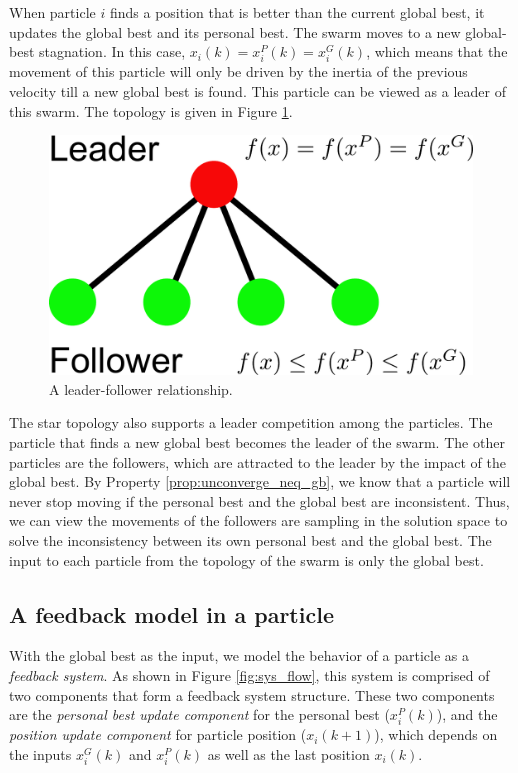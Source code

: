 When particle $ i $ finds a position that is better than the current global best, it updates the global best and its personal best.
The swarm moves to a new global-best stagnation.
In this case, $ x_{i}(k) = x_{i}^{P}(k) = x_{i}^{G}(k) $, which means that the movement of this particle will only be driven by the inertia of the previous velocity till a new global best is found.
This particle can be viewed as a leader of this swarm.
The topology is given in Figure \ref{fig:leader_follower}.
\begin{figure}[tbph]
\centering
\includegraphics[width=0.5\linewidth]{./fig/leader_follower}
\caption{A leader-follower relationship.}
\label{fig:leader_follower}
\end{figure}

The star topology also supports a leader competition among the particles.
The particle that finds a new global best becomes the leader of the swarm.
The other particles are the followers, which are attracted to the leader by the impact of the global best.
By Property \ref{prop:unconverge_neq_gb}, we know that a particle will never stop moving if the personal best and the global best are inconsistent.
Thus, we can view the movements of the followers are sampling in the solution space to solve the inconsistency between its own personal best and the global best.
The input to each particle from the topology of the swarm is only the global best.

\subsection{A feedback model in a particle}

With the global best as the input, we model the behavior of a particle as a \emph{feedback system}.
As shown in Figure \ref{fig:sys_flow}, this system is comprised of two components that form a feedback system structure.
These two components are the 
\emph{personal best update component} for the personal best ($ x^{P}_{i}(k) $), and the 
\emph{position update component} for particle position ($ x_{i}(k+1) $), which depends on the inputs $ x^{G}_{i}(k) $ and $ x^{P}_{i}(k) $ as well as the last position $ x_{i}(k) $.

